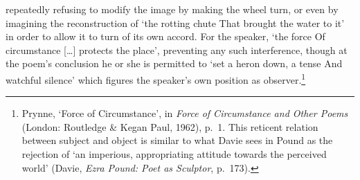 \documentclass[]{article}
\begin{document}
repeatedly refusing to modify the image by making the wheel turn, or
even by imagining the reconstruction of `the rotting chute \textbar{}
That brought the water to it' in order to allow it to turn of its own
accord. For the speaker, `the force \textbar{} Of circumstance
{[}\ldots{}{]} protects the place', preventing any such interference,
though at the poem's conclusion he or she is permitted to `set a heron
down, a tense \textbar{} And watchful silence' which figures the
speaker's own position as observer.\footnote{Prynne, `Force of
  Circumstance', in \emph{Force of Circumstance and Other Poems}
  (London: Routledge \& Kegan Paul, 1962), p.~1. This reticent relation
  between subject and object is similar to what Davie sees in Pound as
  the rejection of `an imperious, appropriating attitude towards the
  perceived world' (Davie, \emph{Ezra Pound: Poet as Sculptor}, p.~173).}
\end{document}
